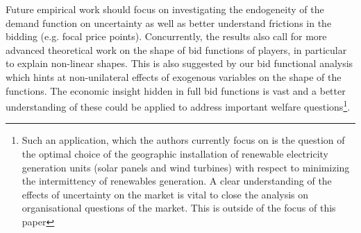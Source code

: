 Future empirical work should focus on investigating the endogeneity of the demand function on uncertainty as well as better understand frictions in the bidding (e.g. focal price points). Concurrently, the results also call for more advanced theoretical work on the shape of bid functions of players, in particular to explain non-linear shapes. This is also suggested by our bid functional analysis which hints at non-unilateral effects of exogenous variables on the shape of the functions. The economic insight hidden in full bid functions is vast and a better understanding of these could be applied to address important welfare questions\footnote{Such an application, which the authors currently focus on is the question of the optimal choice of the geographic installation of renewable electricity generation units (solar panels and wind turbines) with respect to minimizing the intermittency of renewables generation. A clear understanding of the effects of uncertainty on the market is vital to close the analysis on organisational questions of the market. This is outside of the focus of this paper}.\\

